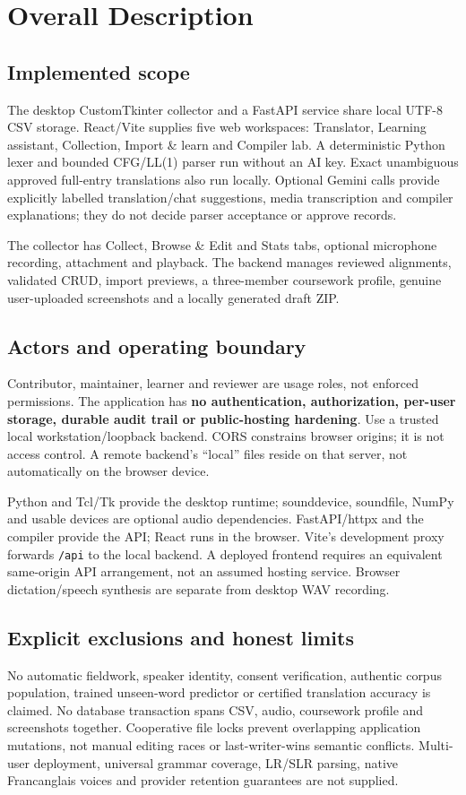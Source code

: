 \documentclass[11pt,a4paper]{article}
\begin{document}
\section{Overall Description}
\subsection{Implemented scope}
The desktop CustomTkinter collector and a FastAPI service share local UTF-8 CSV
storage. React/Vite supplies five web workspaces: Translator, Learning assistant,
Collection, Import \& learn and Compiler lab. A deterministic Python lexer and
bounded CFG/LL(1) parser run without an AI key. Exact unambiguous approved
full-entry translations also run locally. Optional Gemini calls provide
explicitly labelled translation/chat suggestions, media transcription and
compiler explanations; they do not decide parser acceptance or approve records.

The collector has Collect, Browse \& Edit and Stats tabs, optional microphone
recording, attachment and playback. The backend manages reviewed alignments,
validated CRUD, import previews, a three-member coursework profile, genuine
user-uploaded screenshots and a locally generated draft ZIP.

\subsection{Actors and operating boundary}
Contributor, maintainer, learner and reviewer are usage roles, not enforced
permissions. The application has \textbf{no authentication, authorization,
per-user storage, durable audit trail or public-hosting hardening}. Use a
trusted local workstation/loopback backend. CORS constrains browser origins;
it is not access control. A remote backend's ``local'' files reside on that
server, not automatically on the browser device.

Python and Tcl/Tk provide the desktop runtime; sounddevice, soundfile, NumPy
and usable devices are optional audio dependencies. FastAPI/httpx and the
compiler provide the API; React runs in the browser. Vite's development proxy
forwards \nolinkurl{/api} to the local backend. A deployed frontend requires
an equivalent same-origin API arrangement, not an assumed hosting service.
Browser dictation/speech synthesis are separate from desktop WAV recording.

\subsection{Explicit exclusions and honest limits}
No automatic fieldwork, speaker identity, consent verification, authentic
corpus population, trained unseen-word predictor or certified translation
accuracy is claimed. No database transaction spans CSV, audio, coursework
profile and screenshots together. Cooperative file locks prevent overlapping
application mutations, not manual editing races or last-writer-wins semantic
conflicts. Multi-user deployment, universal grammar coverage, LR/SLR parsing,
native Francanglais voices and provider retention guarantees are not supplied.
\end{document}
